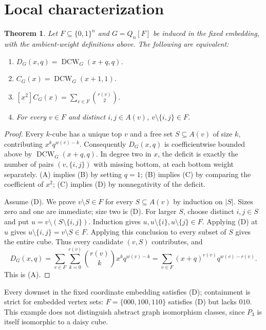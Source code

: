 \documentclass[11pt,a4paper]{article}
\newtheorem{theorem}{Theorem}
\newcommand{\DCW}{\operatorname{DCW}}
\begin{document}
\section{Local characterization}
\begin{theorem}\label{main}
Let $F\subseteq\{0,1\}^n$ and $G=Q_n[F]$ be induced in the fixed embedding, with the ambient-weight definitions above. The following are equivalent:
\begin{enumerate}\renewcommand{\labelenumi}{(\Alph{enumi})}
\item $D_G(x,q)=\DCW_G(x+q,q)$.
\item $C_G(x)=\DCW_G(x+1,1)$.
\item $[x^2]C_G(x)=\displaystyle\sum_{v\in F}\binom{r(v)}{2}$.
\item For every $v\in F$ and distinct $i,j\in A(v)$, $v\setminus\{i,j\}\in F$.
\end{enumerate}
\end{theorem}
\begin{proof}
Every $k$-cube has a unique top $v$ and a free set $S\subseteq A(v)$ of size $k$, contributing $x^kq^{w(v)-k}$. Consequently $D_G(x,q)$ is coefficientwise bounded above by $\DCW_G(x+q,q)$. In degree two in $x$, the deficit is exactly the number of pairs $(v,\{i,j\})$ with missing bottom, at each bottom weight separately.
(A) implies (B) by setting $q=1$; (B) implies (C) by comparing the coefficient of $x^2$; (C) implies (D) by nonnegativity of the deficit.

Assume (D). We prove $v\setminus S\in F$ for every $S\subseteq A(v)$ by induction on $|S|$. Sizes zero and one are immediate; size two is (D). For larger $S$, choose distinct $i,j\in S$ and put $u=v\setminus(S\setminus\{i,j\})$. Induction gives $u,u\setminus\{i\},u\setminus\{j\}\in F$. Applying (D) at $u$ gives $u\setminus\{i,j\}=v\setminus S\in F$. Applying this conclusion to every subset of $S$ gives the entire cube. Thus every candidate $(v,S)$ contributes, and
\[
 D_G(x,q)=\sum_{v\in F}\sum_{k=0}^{r(v)}\binom{r(v)}{k}x^kq^{w(v)-k}
 =\sum_{v\in F}(x+q)^{r(v)}q^{w(v)-r(v)}.
\]
This is (A).
\end{proof}
Every downset in the fixed coordinate embedding satisfies (D); containment is strict for embedded vertex sets: $F=\{000,100,110\}$ satisfies (D) but lacks $010$. This example does not distinguish abstract graph isomorphism classes, since $P_3$ is itself isomorphic to a daisy cube.
\end{document}
